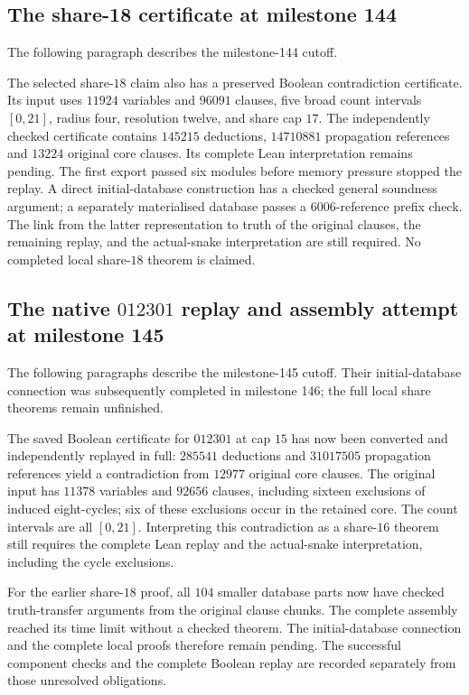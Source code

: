 \documentclass[11pt,a4paper]{article}
\theoremstyle{definition}
\theoremstyle{remark}
\begin{document}
\subsection{The share-18 certificate at milestone 144}
The following paragraph describes the milestone-144 cutoff.

The selected share-$18$ claim also has a preserved Boolean contradiction
certificate. Its input uses $11924$ variables and $96091$ clauses, five
broad count intervals $[0,21]$, radius four, resolution twelve, and share
cap $17$. The independently checked certificate contains $145215$
deductions, $14710881$ propagation references and $13224$ original core
clauses. Its complete Lean interpretation remains pending. The first
export passed six modules before memory pressure stopped the replay.
A direct initial-database construction has a checked general soundness
argument; a separately materialised database passes a $6006$-reference
prefix check. The link from the latter representation to truth of the
original clauses, the remaining replay, and the actual-snake interpretation
are still required. No completed local share-$18$ theorem is claimed.
\subsection{The native $012301$ replay and assembly attempt at milestone 145}
The following paragraphs describe the milestone-145 cutoff. Their
initial-database connection was subsequently completed in milestone 146;
the full local share theorems remain unfinished.

The saved Boolean certificate for $012301$ at cap $15$ has now been
converted and independently replayed in full: $285541$ deductions and
$31017505$ propagation references yield a contradiction from $12977$
original core clauses. The original input has $11378$ variables and
$92656$ clauses, including sixteen exclusions of induced eight-cycles;
six of these exclusions occur in the retained core. The count intervals
are all $[0,21]$. Interpreting this contradiction as a share-$16$ theorem
still requires the complete Lean replay and the actual-snake interpretation,
including the cycle exclusions.

For the earlier share-$18$ proof, all $104$ smaller database parts now
have checked truth-transfer arguments from the original clause chunks.
The complete assembly reached its time limit without a checked theorem.
The initial-database connection and the complete local proofs therefore
remain pending. The successful component checks and the complete Boolean
replay are recorded separately from those unresolved obligations.
\end{document}
